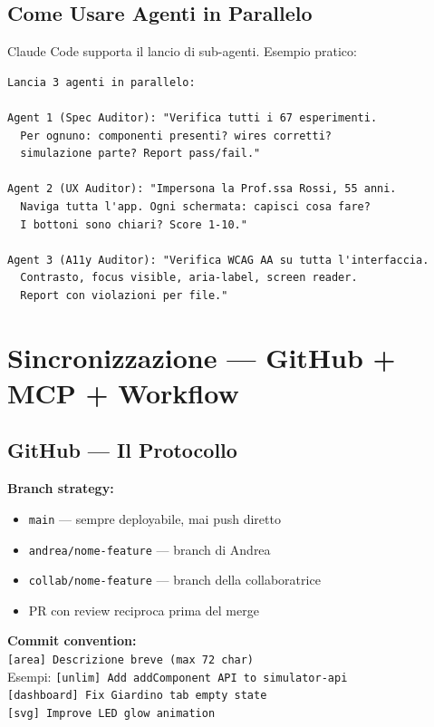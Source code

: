 \documentclass[11pt,a4paper]{article}
\begin{document}
\subsection{Come Usare Agenti in Parallelo}

Claude Code supporta il lancio di sub-agenti. Esempio pratico:

\begin{lstlisting}[title=Esempio: audit parallelo con 3 agenti]
Lancia 3 agenti in parallelo:

Agent 1 (Spec Auditor): "Verifica tutti i 67 esperimenti.
  Per ognuno: componenti presenti? wires corretti?
  simulazione parte? Report pass/fail."

Agent 2 (UX Auditor): "Impersona la Prof.ssa Rossi, 55 anni.
  Naviga tutta l'app. Ogni schermata: capisci cosa fare?
  I bottoni sono chiari? Score 1-10."

Agent 3 (A11y Auditor): "Verifica WCAG AA su tutta l'interfaccia.
  Contrasto, focus visible, aria-label, screen reader.
  Report con violazioni per file."
\end{lstlisting}

\section{Sincronizzazione --- GitHub + MCP + Workflow}

\subsection{GitHub --- Il Protocollo}

\begin{tecnico}
\textbf{Branch strategy:}
\begin{itemize}[leftmargin=1.5em]
  \item \texttt{main} --- sempre deployabile, mai push diretto
  \item \texttt{andrea/nome-feature} --- branch di Andrea
  \item \texttt{collab/nome-feature} --- branch della collaboratrice
  \item PR con review reciproca prima del merge
\end{itemize}

\textbf{Commit convention:}\\
\texttt{[area] Descrizione breve (max 72 char)}\\
Esempi: \texttt{[unlim] Add addComponent API to simulator-api}\\
\texttt{[dashboard] Fix Giardino tab empty state}\\
\texttt{[svg] Improve LED glow animation}
\end{tecnico}
\end{document}
